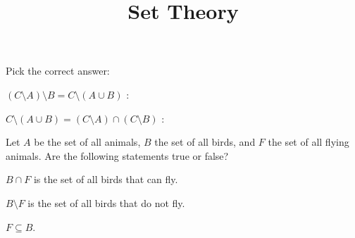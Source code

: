 \documentclass{ximera}
\title{Set Theory}
\begin{document}
\maketitle

Pick the correct answer:
\begin{question}
$(C \setminus A) \setminus B = C \setminus (A \cup B)$ :
\begin{solution}
\begin{multiple-choice}
\end{multiple-choice}
\end{solution}
\end{question}

\begin{question}
$C \setminus (A \cup B) = (C \setminus A) \cap (C\setminus B)$ :
\begin{solution}
\begin{multiple-choice}
\end{multiple-choice}
\end{solution}
\end{question}


\begin{question}
Let $A$ be the set of all animals, $B$ the set of all birds, and $F$
the set of all flying animals. Are the following statements true or false?

\begin{question}
$B\cap F$ is the set of all birds that can fly.
\begin{solution}
\begin{multiple-choice}
\end{multiple-choice}
\end{solution}
\end{question}

\begin{question}
$B\setminus F$ is the set of all birds that do not fly.
\begin{solution}
\begin{multiple-choice}
\end{multiple-choice}
\end{solution}
\end{question}

\begin{question}
$F\subseteq B$.
\begin{solution}
\begin{multiple-choice}
\end{multiple-choice}
\end{solution}
\end{question}

\end{question}
\end{document}
